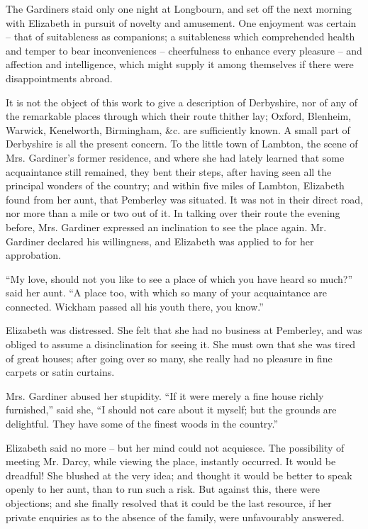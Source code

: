 The Gardiners staid only one night at Longbourn, and set
off the next morning with Elizabeth in pursuit of novelty
and amusement. One enjoyment was certain -- that of
suitableness as companions; a suitableness which
comprehended health and temper to bear inconveniences --
cheerfulness to enhance every pleasure -- and affection and
intelligence, which might supply it among themselves if
there were disappointments abroad.

It is not the object of this work to give a description
of Derbyshire, nor of any of the remarkable places through
which their route thither lay; Oxford, Blenheim, Warwick,
Kenelworth, Birmingham, \&c. are sufficiently known.
A small part of Derbyshire is all the present concern.
To the little town of Lambton, the scene of Mrs. Gardiner’s
former residence, and where she had lately learned that
some acquaintance still remained, they bent their steps,
after having seen all the principal wonders of the country;
and within five miles of Lambton, Elizabeth found from
her aunt, that Pemberley was situated. It was not in
their direct road, nor more than a mile or two out of it.
In talking over their route the evening before, Mrs.
Gardiner expressed an inclination to see the place again.
Mr. Gardiner declared his willingness, and Elizabeth was
applied to for her approbation.

“My love, should not you like to see a place of which
you have heard so much?” said her aunt. “A place too,
with which so many of your acquaintance are connected.
Wickham passed all his youth there, you know.”

Elizabeth was distressed. She felt that she had no
business at Pemberley, and was obliged to assume a disinclination
for seeing it. She must own that she was tired
of great houses; after going over so many, she really had
no pleasure in fine carpets or satin curtains.

Mrs. Gardiner abused her stupidity. “If it were merely
a fine house richly furnished,” said she, “I should not
care about it myself; but the grounds are delightful.
They have some of the finest woods in the country.”

Elizabeth said no more -- but her mind could not
acquiesce. The possibility of meeting Mr. Darcy, while
viewing the place, instantly occurred. It would be
dreadful! She blushed at the very idea; and thought
it would be better to speak openly to her aunt, than to
run such a risk. But against this, there were objections;
and she finally resolved that it could be the last resource,
if her private enquiries as to the absence of the family,
were unfavourably answered.

